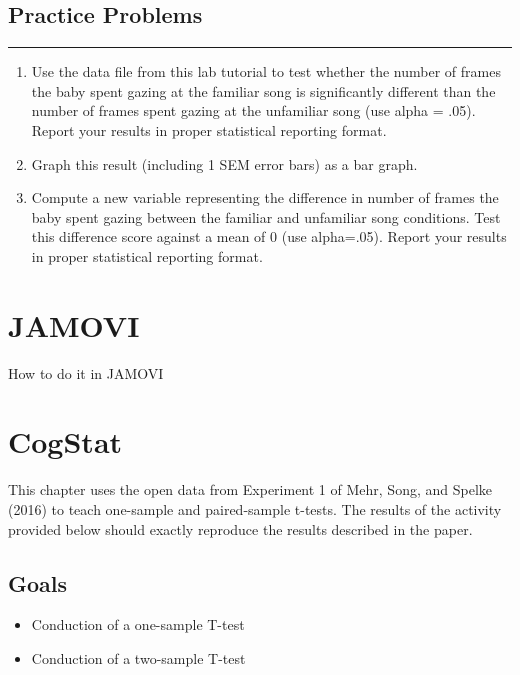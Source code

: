 \documentclass[
]{book}
\begin{document}
\hypertarget{practice-problems-5}{%
\subsection{Practice Problems}\label{practice-problems-5}}

\begin{center}\rule{0.5\linewidth}{0.5pt}\end{center}

\begin{enumerate}
\def\labelenumi{\arabic{enumi}.}
\item
  Use the data file from this lab tutorial to test whether the number of frames the baby spent gazing at the familiar song is significantly different than the number of frames spent gazing at the unfamiliar song (use alpha = .05). Report your results in proper statistical reporting format.
\item
  Graph this result (including 1 SEM error bars) as a bar graph.
\item
  Compute a new variable representing the difference in number of frames the baby spent gazing between the familiar and unfamiliar song conditions. Test this difference score against a mean of 0 (use alpha=.05). Report your results in proper statistical reporting format.
\end{enumerate}

\hypertarget{jamovi-6}{%
\section{JAMOVI}\label{jamovi-6}}

How to do it in JAMOVI

\hypertarget{cogstat-7}{%
\section{CogStat}\label{cogstat-7}}

This chapter uses the open data from Experiment 1 of Mehr, Song, and Spelke (2016) to teach one-sample and paired-sample t-tests. The results of the activity provided below should exactly reproduce the results described in the paper.

\hypertarget{goals-5}{%
\subsection{Goals}\label{goals-5}}

\begin{itemize}
\item
  Conduction of a one-sample T-test
\item
  Conduction of a two-sample T-test
\end{itemize}
\end{document}
